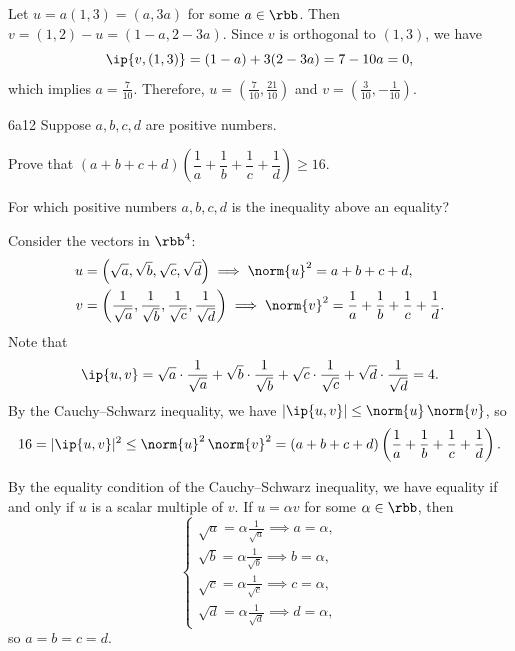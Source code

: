 \begin{sol}
    Let $u = a(1, 3) = (a, 3a)$ for some $a \in \rbb$.
    Then $v = (1, 2) - u = (1 - a, 2 - 3a)$.
    Since $v$ is orthogonal to $(1, 3)$, we have
    \[
        \ip{v, (1, 3)} = (1 - a) + 3(2 - 3a) = 7 - 10a = 0,
    \]
    which implies $a = \frac{7}{10}$.
    Therefore, $u = \left(\frac{7}{10}, \frac{21}{10}\right)$ and $v = \left(\frac{3}{10}, -\frac{1}{10}\right)$.
\end{sol}

\begin{exercise}{6a12}
    Suppose $a, b, c, d$ are positive numbers.
    \begin{subexercises}
        \item Prove that $(a + b + c + d)\left(\dfrac{1}{a} + \dfrac{1}{b} + \dfrac{1}{c} + \dfrac{1}{d}\right) \geq 16$.
        \item For which positive numbers $a, b, c, d$ is the inequality above an equality?
    \end{subexercises}
\end{exercise}

\begin{solenum}
    \item Consider the vectors in $\rbb^4$:
    \begin{align*}
        u &= \left(\sqrt{a}, \sqrt{b}, \sqrt{c}, \sqrt{d}\right) \implies \norm{u}^2 = a + b + c + d, \\
        v &= \left(\frac{1}{\sqrt{a}}, \frac{1}{\sqrt{b}}, \frac{1}{\sqrt{c}}, \frac{1}{\sqrt{d}}\right) \implies \norm{v}^2 = \frac{1}{a} + \frac{1}{b} + \frac{1}{c} + \frac{1}{d}.
    \end{align*}
    Note that
    \[
        \ip{u, v} = \sqrt{a}\cdot\frac{1}{\sqrt{a}} + \sqrt{b}\cdot\frac{1}{\sqrt{b}} + \sqrt{c}\cdot\frac{1}{\sqrt{c}} + \sqrt{d}\cdot\frac{1}{\sqrt{d}} = 4.
    \]
    By the Cauchy--Schwarz inequality, we have $|\ip{u, v}| \leq \norm{u}\,\norm{v}$, so
    \[
        16 = |\ip{u, v}|^2 \leq \norm{u}^2\,\norm{v}^2 = (a + b + c + d)\left(\frac{1}{a} + \frac{1}{b} + \frac{1}{c} + \frac{1}{d}\right).
    \]
    \item By the equality condition of the Cauchy--Schwarz inequality, we have equality if and only if $u$ is a scalar multiple of $v$.
    If $u = \alpha v$ for some $\alpha \in \rbb$, then
    \[
        \begin{cases}
            \sqrt{a} = \alpha\frac{1}{\sqrt{a}} \implies a = \alpha, \\
            \sqrt{b} = \alpha\frac{1}{\sqrt{b}} \implies b = \alpha, \\
            \sqrt{c} = \alpha\frac{1}{\sqrt{c}} \implies c = \alpha, \\
            \sqrt{d} = \alpha\frac{1}{\sqrt{d}} \implies d = \alpha,
        \end{cases}
    \]
    so $a = b = c = d$.
\end{solenum}

